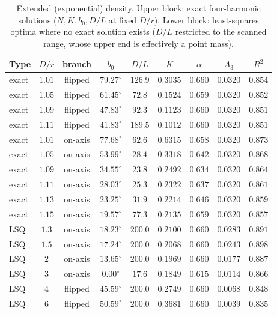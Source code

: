 \documentclass[10pt]{article}
\begin{document}
\begin{table}[!htb]\centering\small
\caption{Extended (exponential) density. Upper block: exact four-harmonic solutions ($N,K,b_0,D/L$ at fixed $D/r$). Lower block: least-squares optima where no exact solution exists ($D/L$ restricted to the scanned range, whose upper end is effectively a point mass).}\label{tab:ext}
\begin{tabular}{lcccccccc}\toprule
Type & $D/r$ & branch & $b_0$ & $D/L$ & $K$ & $\alpha$ & $A_3$ & $R^2$\\\midrule

exact & $1.01$ & flipped & $79.27^\circ$ & $126.9$ & $0.3035$ & $0.660$ & $0.0320$ & $0.854$\\
exact & $1.05$ & flipped & $61.45^\circ$ & $72.8$ & $0.1524$ & $0.659$ & $0.0320$ & $0.852$\\
exact & $1.09$ & flipped & $47.83^\circ$ & $92.3$ & $0.1123$ & $0.660$ & $0.0320$ & $0.851$\\
exact & $1.11$ & flipped & $41.83^\circ$ & $189.5$ & $0.1012$ & $0.660$ & $0.0320$ & $0.851$\\
exact & $1.01$ & on-axis & $77.68^\circ$ & $62.6$ & $0.6315$ & $0.658$ & $0.0320$ & $0.873$\\
exact & $1.05$ & on-axis & $53.99^\circ$ & $28.4$ & $0.3318$ & $0.642$ & $0.0320$ & $0.868$\\
exact & $1.09$ & on-axis & $34.55^\circ$ & $23.8$ & $0.2492$ & $0.634$ & $0.0320$ & $0.864$\\
exact & $1.11$ & on-axis & $28.03^\circ$ & $25.3$ & $0.2322$ & $0.637$ & $0.0320$ & $0.861$\\
exact & $1.13$ & on-axis & $23.25^\circ$ & $31.9$ & $0.2214$ & $0.646$ & $0.0320$ & $0.859$\\
exact & $1.15$ & on-axis & $19.57^\circ$ & $77.3$ & $0.2135$ & $0.659$ & $0.0320$ & $0.857$\\
\midrule
LSQ & $1.3$ & on-axis & $18.23^\circ$ & $200.0$ & $0.2100$ & $0.660$ & $0.0283$ & $0.891$\\
LSQ & $1.5$ & on-axis & $17.24^\circ$ & $200.0$ & $0.2068$ & $0.660$ & $0.0243$ & $0.898$\\
LSQ & $2$ & on-axis & $13.65^\circ$ & $200.0$ & $0.1969$ & $0.660$ & $0.0177$ & $0.887$\\
LSQ & $3$ & on-axis & $0.00^\circ$ & $17.6$ & $0.1849$ & $0.615$ & $0.0114$ & $0.866$\\
LSQ & $4$ & flipped & $45.59^\circ$ & $200.0$ & $0.2749$ & $0.660$ & $0.0068$ & $0.848$\\
LSQ & $6$ & flipped & $50.59^\circ$ & $200.0$ & $0.3681$ & $0.660$ & $0.0039$ & $0.835$\\
\bottomrule
\end{tabular}
\end{table}
\end{document}
